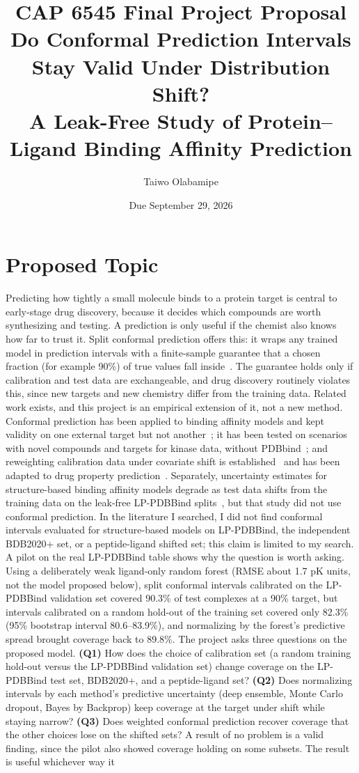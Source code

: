\documentclass[11pt]{article}
\title{CAP 6545 Final Project Proposal\\[0.4em]
  \large Do Conformal Prediction Intervals Stay Valid Under Distribution Shift?\\
  A Leak-Free Study of Protein--Ligand Binding Affinity Prediction}
\author{Taiwo Olabamipe}
\date{Due September 29, 2026}
\begin{document}
\maketitle

\section*{Proposed Topic}

Predicting how tightly a small molecule binds to a protein target is central to early-stage drug discovery, because it decides which compounds are worth synthesizing and testing. A prediction is only useful if the chemist also knows how far to trust it. Split conformal prediction offers this: it wraps any trained model in prediction intervals with a finite-sample guarantee that a chosen fraction (for example 90\%) of true values fall inside~\cite{angelopoulos2023}. The guarantee holds only if calibration and test data are exchangeable, and drug discovery routinely violates this, since new targets and new chemistry differ from the training data. Related work exists, and this project is an empirical extension of it, not a new method. Conformal prediction has been applied to binding affinity models and kept validity on one external target but not another~\cite{parks2020}; it has been tested on scenarios with novel compounds and targets for kinase data, without PDBbind~\cite{orsolic2023}; and reweighting calibration data under covariate shift is established~\cite{tibshirani2019} and has been adapted to drug property prediction~\cite{codrug2023}. Separately, uncertainty estimates for structure-based binding affinity models degrade as test data shifts from the training data on the leak-free LP-PDBBind splits~\cite{rayka2025,lppdbbind}, but that study did not use conformal prediction. In the literature I searched, I did not find conformal intervals evaluated for structure-based models on LP-PDBBind, the independent BDB2020+ set, or a peptide-ligand shifted set; this claim is limited to my search. A pilot on the real LP-PDBBind table shows why the question is worth asking. Using a deliberately weak ligand-only random forest (RMSE about 1.7 pK units, not the model proposed below), split conformal intervals calibrated on the LP-PDBBind validation set covered 90.3\% of test complexes at a 90\% target, but intervals calibrated on a random hold-out of the training set covered only 82.3\% (95\% bootstrap interval 80.6--83.9\%), and normalizing by the forest's predictive spread brought coverage back to 89.8\%. The project asks three questions on the proposed model. \textbf{(Q1)} How does the choice of calibration set (a random training hold-out versus the LP-PDBBind validation set) change coverage on the LP-PDBBind test set, BDB2020+, and a peptide-ligand set? \textbf{(Q2)} Does normalizing intervals by each method's predictive uncertainty (deep ensemble, Monte Carlo dropout, Bayes by Backprop) keep coverage at the target under shift while staying narrow? \textbf{(Q3)} Does weighted conformal prediction recover coverage that the other choices lose on the shifted sets? A result of no problem is a valid finding, since the pilot also showed coverage holding on some subsets. The result is useful whichever way it 
\end{document}
